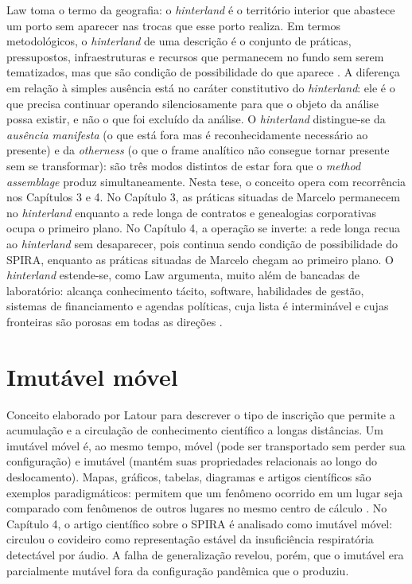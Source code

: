 \begin{description}
Law toma o termo da geografia: o \textit{hinterland} é o território interior que abastece um porto sem aparecer nas trocas que esse porto realiza. Em termos metodológicos, o \textit{hinterland} de uma descrição é o conjunto de práticas, pressupostos, infraestruturas e recursos que permanecem no fundo sem serem tematizados, mas que são condição de possibilidade do que aparece \parencite[pp.~34--42]{Law2004After}. A diferença em relação à simples ausência está no caráter constitutivo do \textit{hinterland}: ele é o que precisa continuar operando silenciosamente para que o objeto da análise possa existir, e não o que foi excluído da análise. O \textit{hinterland} distingue-se da \textit{ausência manifesta} (o que está fora mas é reconhecidamente necessário ao presente) e da \textit{otherness} (o que o frame analítico não consegue tornar presente sem se transformar): são três modos distintos de estar fora que o \textit{method assemblage} produz simultaneamente. Nesta tese, o conceito opera com recorrência nos Capítulos 3 e 4. No Capítulo 3, as práticas situadas de Marcelo permanecem no \textit{hinterland} enquanto a rede longa de contratos e genealogias corporativas ocupa o primeiro plano. No Capítulo 4, a operação se inverte: a rede longa recua ao \textit{hinterland} sem desaparecer, pois continua sendo condição de possibilidade do SPIRA, enquanto as práticas situadas de Marcelo chegam ao primeiro plano. O \textit{hinterland} estende-se, como Law argumenta, muito além de bancadas de laboratório: alcança conhecimento tácito, software, habilidades de gestão, sistemas de financiamento e agendas políticas, cuja lista é interminável e cujas fronteiras são porosas em todas as direções \parencite[pp.~40--41]{Law2004After}.

\bigskip

\section*{Imutável móvel}

Conceito elaborado por Latour para descrever o tipo de inscrição que permite a acumulação e a circulação de conhecimento científico a longas distâncias. Um imutável móvel é, ao mesmo tempo, móvel (pode ser transportado sem perder sua configuração) e imutável (mantém suas propriedades relacionais ao longo do deslocamento). Mapas, gráficos, tabelas, diagramas e artigos científicos são exemplos paradigmáticos: permitem que um fenômeno ocorrido em um lugar seja comparado com fenômenos de outros lugares no mesmo centro de cálculo \parencite{Latour1990Drawing,Latour2011CienciaEmAcao}. No Capítulo 4, o artigo científico sobre o SPIRA é analisado como imutável móvel: circulou o covideiro como representação estável da insuficiência respiratória detectável por áudio. A falha de generalização revelou, porém, que o imutável era parcialmente mutável fora da configuração pandêmica que o produziu.


\end{description}

